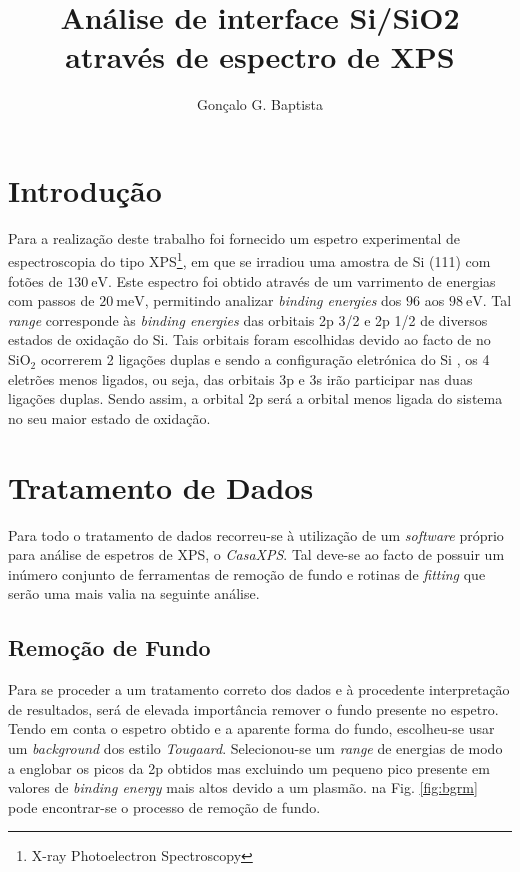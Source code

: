 \documentclass[baaa]{baaa}
\title{Análise de interface Si/SiO2\\através de espectro de XPS}
\author{
Gonçalo G. Baptista\inst{1}
}
\institute{
NOVA School of Science and Technology, NOVA SST, Portugal
}
\begin{document}
\maketitle

\section{Introdução}\label{S_intro}

Para a realização deste trabalho foi fornecido um espetro experimental de espectroscopia do tipo XPS\footnote{X-ray Photoelectron Spectroscopy}, em que se irradiou uma amostra de Si (111) com fotões de $130\ \si{\electronvolt}$. Este espectro foi obtido através de um varrimento de energias com passos de $20\ \si{\milli\electronvolt}$, permitindo analizar \textit{binding energies} dos $96$ aos $98\ \si{\electronvolt}$. Tal \textit{range} corresponde às \textit{binding energies} das orbitais 2p 3/2 e 2p 1/2 de diversos estados de oxidação do Si. Tais orbitais foram escolhidas devido ao facto de no SiO$_2$ ocorrerem 2 ligações duplas e sendo a configuração eletrónica do Si , os 4 eletrões menos ligados, ou seja, das orbitais 3p e 3s irão participar nas duas ligações duplas. Sendo assim, a orbital 2p será a orbital menos ligada do sistema no seu maior estado de oxidação.


\section{Tratamento de Dados}
Para todo o tratamento de dados recorreu-se à utilização de um \textit{software} próprio para análise de espetros de XPS, o \textit{CasaXPS}. Tal deve-se ao facto de possuir um inúmero conjunto de ferramentas de remoção de fundo e rotinas de \textit{fitting} que serão uma mais valia na seguinte análise.


\subsection{Remoção de Fundo}

Para se proceder a um tratamento correto dos dados e à procedente interpretação de resultados, será de elevada importância remover o fundo presente no espetro. Tendo em conta o espetro obtido e a aparente forma do fundo, escolheu-se usar um \textit{background} dos estilo \textit{Tougaard}. Selecionou-se um \textit{range} de energias de modo a englobar os picos da 2p obtidos mas excluindo um pequeno pico presente em valores de \textit{binding energy} mais altos devido a um plasmão. na Fig. \ref{fig:bgrm} pode encontrar-se o processo de remoção de fundo.
\end{document}

